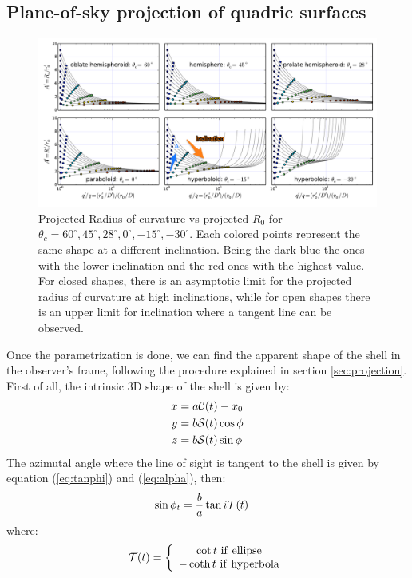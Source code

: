 \subsection{Plane-of-sky projection of quadric surfaces} 
\begin{figure}
\includegraphics[width=0.9\linewidth]{annotated}
\caption{Projected Radius of curvature vs projected $R_0$ for $\theta_c=60^\circ,45^\circ,28^\circ, 0^\circ,-15^\circ,-30^\circ$. Each colored points represent
the same shape at a different inclination. Being the dark blue the ones with the lower inclination and the red ones with the highest value. For closed shapes, there is
an asymptotic limit for the projected radius of curvature at high inclinations, while for open shapes there is an upper limit for inclination where a tangent line can be observed.}
\label{fig:Apqp}
\end{figure}

Once the parametrization is done, we can find the apparent shape of
the shell in the observer's frame, following the procedure explained
in section \ref{sec:projection}.  First of all, the intrinsic 3D shape of the shell is given by:
\begin{align}
x &= a\mathcal{C}(t)-x_0 \\ 
y &= b\mathcal{S}(t)\cos\phi \\
z &=  b\mathcal{S}(t)\sin\phi
\end{align}
The azimutal angle where the line of sight is tangent to the shell is given by equation (\ref{eq:tanphi}) and (\ref{eq:alpha}), then:
\begin{align}
\sin\phi_t &= \frac{b}{a}\tan i\mathcal{T}(t) 
\end{align}
where:
\begin{align}
\mathcal{T}(t) = \left\lbrace \begin{array}{c}
\cot t ~\mathrm{if~ellipse} \\
-\coth t ~\mathrm{if~hyperbola}
\end{array}\right.
\end{align}

